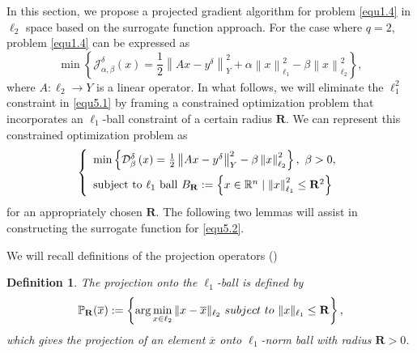 \documentclass[a4paper,12pt]{article}
\newtheorem{definition}[theorem]{Definition}
\numberwithin{equation}{section}
\begin{document}
\par In this section, we propose a projected gradient algorithm for problem  \eqref{equ1.4} in $\ell_{2}$ space based on the surrogate function approach. For the case where $q=2$, problem \eqref{equ1.4} can be expressed as
\\
\begin{equation}\label{equ5.1}
    \min\left\{\mathcal{J}_{\alpha,\beta}^{\delta}\left(x\right)= \frac{1}{2}\left\|Ax-y^{\delta}\right\|_{Y}^{2}+ \alpha\left\|x\right\|_{\ell_{1}}^{2}-\beta\left\|x\right\|_{\ell_{2}}^{2}\right\},
\end{equation}
where $A:\ell_{2}\rightarrow Y$ is a linear operator. In what follows, we will eliminate the $\ell_{1}^{2}$ constraint in \eqref{equ5.1} by framing a constrained optimization problem that incorporates an $\ell_{1}$-ball constraint of a certain radius $\mathbf{R}$. We can represent this constrained optimization problem as
\begin{align}\label{equ5.2}
    \left\{             
        \begin{array}{ll}
        \min\left\{\mathcal{D}_{\beta}^{\delta}\left(x\right) =\frac{1}{2} \left\|Ax-y^{\delta}\right\|_{Y}^{2}-\beta\left\|x\right\|_{\ell_{2}}^{2}\right\} ,\ \beta> 0, \vspace{1ex} \\
        {\rm subject\ to}\ \ell_{1}\ {\rm ball}\ B_{\mathbf{R}}:=\left\{x\in\mathbb{R}^{n}\mid\left\|x\right\|_{\ell_{1}}^{2}\leq \mathbf{R}^{2}\right\} \\
        \end{array}
    \right.
\end{align}
for an appropriately chosen $\mathbf{R}$. The following two lemmas will assist in constructing the surrogate function for \eqref{equ5.2}.

\par We will recall definitions of the projection operators (\cite{BA17})

\begin{definition}\label{def5.1}
    The projection onto the $\ell_{1}$-ball is defined by
    \begin{equation*}
        \mathbb{P}_{\mathbf{R}}(\overline{x}):=\left\{{\rm arg}\min_{x\in\ell_{2}}\|x-\overline{x}\|_{\ell_{2}}\ subject\ to\ \|x\|_{\ell_{1}}\leq \mathbf{R}\right\},
    \end{equation*}
    which gives the projection of an element $\overline{x}$ onto $\ell_{1}$-norm ball with radius $\mathbf{R}>0$.
\end{definition}
\end{document}
